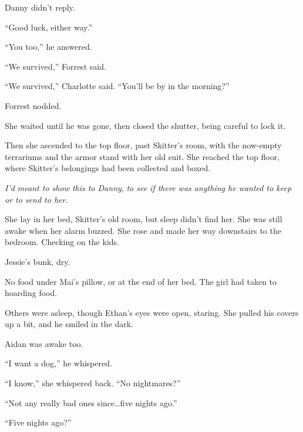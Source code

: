 Danny didn't reply.



``Good luck, either way.''



``You too,'' he answered.



``We survived,'' Forrest said.



``We survived,'' Charlotte said.  ``You'll be by in the morning?''



Forrest nodded.



She waited until he was gone, then closed the shutter, being careful to lock it.



Then she ascended to the top floor, past Skitter's room, with the now-empty terrariums and the armor stand with her old suit.  She reached the top floor, where Skitter's belongings had been collected and boxed.



\emph{I'd meant to show this to Danny}, \emph{to see if there was anything he wanted to keep or to send to her.}



She lay in her bed, Skitter's old room, but sleep didn't find her.  She was still awake when her alarm buzzed.  She rose and made her way downstairs to the bedroom.  Checking on the kids.



Jessie's bunk, dry.



No food under Mai's pillow, or at the end of her bed.  The girl had taken to hoarding food.



Others were asleep, though Ethan's eyes were open, staring.  She pulled his covers up a bit, and he smiled in the dark.



Aidan was awake too.



``I want a dog,'' he whispered.



``I know,'' she whispered back.  ``No nightmares?''



``Not any really bad ones since\ldots five nights ago.''



``Five nights ago?''



